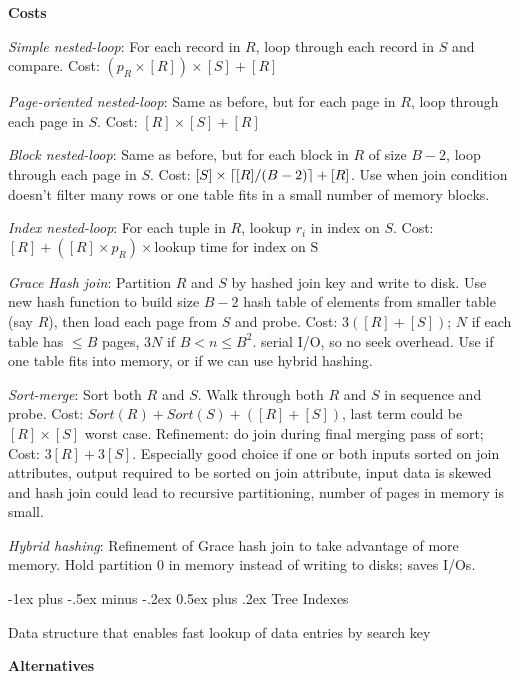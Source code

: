\documentclass[10pt,landscape]{article}
\makeatletter
\DeclarePairedDelimiter{\ceil}{\lceil}{\rceil}
\renewcommand{\section}{\@startsection{section}{1}{0mm}%
                                {-1ex plus -.5ex minus -.2ex}%
                                {0.5ex plus .2ex}%
                                {\normalfont\large\bfseries}}
\makeatother
\begin{document}
\begin{multicols}{3}
\textbf{Costs}

\textit{Simple nested-loop}: For each record in $R$, loop through each record in $S$ and compare. Cost: $(p_R \times [R]) \times [S] + [R]$

\textit{Page-oriented nested-loop}: Same as before, but for each page in $R$, loop through each page in $S$. Cost: $[R] \times [S] + [R]$

\textit{Block nested-loop}: Same as before, but for each block in $R$ of size $B-2$, loop through each page in $S$. Cost: $[S]\times\ceil*{[R] / (B-2)} + [R]$. Use when join condition doesn't filter many rows or one table fits in a small number of memory blocks.

\textit{Index nested-loop}: For each tuple in $R$, lookup $r_i$ in index on $S$. Cost: $[R] + ([R] \times p_R) \times \text{lookup time for index on S}$

\textit{Grace Hash join}: Partition $R$ and $S$ by hashed join key and write to disk. Use new hash function to build size $B-2$ hash table of elements from smaller table (say $R$), then load each page from $S$ and probe. Cost: $3([R]+[S])$; $N$ if each table has $\le B$ pages, $3N$ if $B < n \le B^2$. serial I/O, so no seek overhead. Use if one table fits into memory, or if we can use hybrid hashing.

\textit{Sort-merge}: Sort both $R$ and $S$. Walk through both $R$ and $S$ in sequence and probe. Cost: $Sort(R) + Sort(S) + ([R] + [S])$, last term could be $[R] \times [S]$ worst case. Refinement: do join during final merging pass of sort; Cost: $3[R] + 3[S]$. Especially good choice if one or both inputs sorted on join attributes, output required to be sorted on join attribute, input data is skewed and hash join could lead to recursive partitioning, number of pages in memory is small.

\textit{Hybrid hashing}: Refinement of Grace hash join to take advantage of more memory. Hold partition 0 in memory instead of writing to disks; saves I/Os.


\section{Tree Indexes}

Data structure that enables fast lookup of data entries by search key

\textbf{Alternatives}


\end{multicols}
\end{document}

